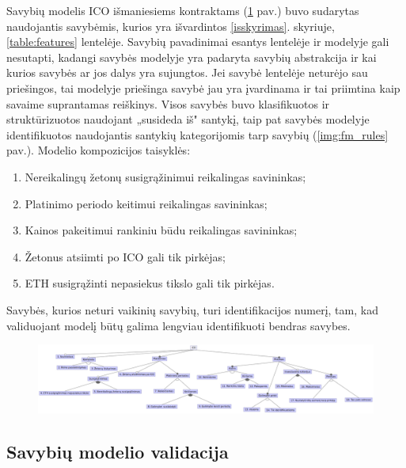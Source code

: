 \documentclass{VUMIFPSkursinis}
\begin{document}
Savybių modelis ICO išmaniesiems kontraktams (\ref{img:fm_ico} pav.) buvo sudarytas naudojantis savybėmis, kurios yra išvardintos \ref{isskyrimas}. skyriuje, \ref{table:features} lentelėje. Savybių pavadinimai esantys lentelėje ir modelyje gali nesutapti, kadangi savybės modelyje yra padaryta savybių abstrakcija ir kai kurios savybės ar jos dalys yra sujungtos. Jei savybė lentelėje neturėjo sau priešingos, tai modelyje priešinga savybė jau yra įvardinama ir tai priimtina kaip savaime suprantamas reiškinys. Visos savybės buvo klasifikuotos ir struktūrizuotos naudojant „susideda iš" santykį, taip pat savybės modelyje identifikuotos naudojantis santykių kategorijomis tarp savybių (\ref{img:fm_rules} pav.). Modelio kompozicijos taisyklės:
\begin{enumerate}[topsep=0pt,itemsep=-1ex,partopsep=1ex,parsep=1ex]
\item Nereikalingų žetonų susigrąžinimui reikalingas savininkas;
\item Platinimo periodo keitimui reikalingas savininkas;
\item Kainos pakeitimui rankiniu būdu reikalingas savininkas;
\item Žetonus atsiimti po ICO gali tik pirkėjas;
\item ETH susigrąžinti nepasiekus tikslo gali tik pirkėjas.
\end{enumerate}

Savybės, kurios neturi vaikinių savybių, turi identifikacijos numerį, tam, kad validuojant modelį būtų galima lengviau identifikuoti bendras savybes.

\begin{figure}

\begin{center}
    \includegraphics[scale=0.5]{img/ico_model_num}
    \label{img:fm_ico}
\end{center}

\end{figure}
\pagebreak

\subsection{Savybių modelio validacija} \label{validacija}
\end{document}
